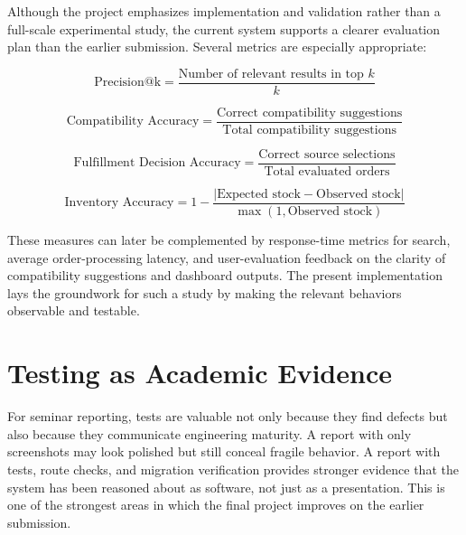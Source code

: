 \documentclass[12pt,letterpaper,oneside,openany]{book}
\begin{document}
\begin{justifying}
Although the project emphasizes implementation and validation rather than a
full-scale experimental study, the current system supports a clearer evaluation
plan than the earlier submission. Several metrics are especially appropriate:
\end{justifying}

\begin{equation}
\text{Precision@k} = \frac{\text{Number of relevant results in top }k}{k}
\end{equation}

\begin{equation}
\text{Compatibility Accuracy} = \frac{\text{Correct compatibility suggestions}}{\text{Total compatibility suggestions}}
\end{equation}

\begin{equation}
\text{Fulfillment Decision Accuracy} = \frac{\text{Correct source selections}}{\text{Total evaluated orders}}
\end{equation}

\begin{equation}
\text{Inventory Accuracy} = 1 - \frac{|\text{Expected stock} - \text{Observed stock}|}{\max(1,\text{Observed stock})}
\end{equation}

\begin{justifying}
These measures can later be complemented by response-time metrics for search,
average order-processing latency, and user-evaluation feedback on the clarity of
compatibility suggestions and dashboard outputs. The present implementation lays
the groundwork for such a study by making the relevant behaviors observable and
testable.
\end{justifying}

\section{Testing as Academic Evidence}

\begin{justifying}
For seminar reporting, tests are valuable not only because they find defects but
also because they communicate engineering maturity. A report with only
screenshots may look polished but still conceal fragile behavior. A report with
tests, route checks, and migration verification provides stronger evidence that
the system has been reasoned about as software, not just as a presentation.
This is one of the strongest areas in which the final project improves on the
earlier submission.
\end{justifying}
\end{document}
